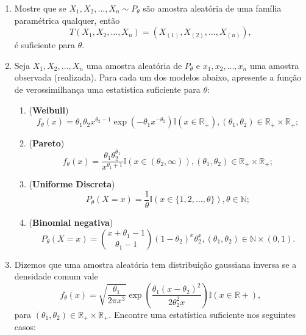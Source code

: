\documentclass[a4paper,10pt, notitlepage]{report}
\newcommand{\rs}{X_1, X_2, \ldots, X_n} %
\newcommand{\rsd}{x_1, x_2, \ldots, x_n} %
\newcommand{\rpl}{\mathbb{R}_+}
\begin{document}
\begin{enumerate}
    \item Mostre que se $\rs \sim P_\theta$ são amostra aleatória de uma família paramétrica qualquer, então
    $$T(\rs) = (X_{(1)}, X_{(2)}, \ldots, X_{(n)}),$$
    é suficiente para $\theta$.
    \item Seja $\rs$ uma amostra aleatória de $P_\theta$ e $\rsd$ uma amostra observada (realizada).
    Para cada um dos modelos abaixo, apresente a função de verossimilhança uma estatística suficiente para $\theta$:
    \begin{enumerate}
        \item (\textbf{Weibull})
        \begin{equation*}
            f_\theta(x) = \theta_1\theta_2 x^{\theta_2-1}\exp\left(-\theta_1 x^{-\theta_2}\right)\mathbb{I}(x \in \rpl), (\theta_1, \theta_2) \in \rpl \times \rpl;
        \end{equation*}
        \item (\textbf{Pareto}) 
        \begin{equation*}
            f_\theta(x) = \frac{\theta_1\theta_2^{\theta_1}}{x^{\theta_1 + 1}}\mathbb{I}\left(x \in (\theta_2, \infty)\right), (\theta_1, \theta_2) \in \rpl \times \rpl;
        \end{equation*}
        \item (\textbf{Uniforme Discreta})
        \begin{equation*}
            P_\theta(X = x) = \frac{1}{\theta}\mathbb{I}(x \in \{1, 2, \ldots,\theta\}), \theta \in \mathbb{N};
        \end{equation*}
        \item (\textbf{Binomial negativa})
        \begin{equation*}
            P_\theta(X = x) = \binom{x + \theta_1 - 1}{\theta_1-1}(1-\theta_2)^x \theta_2^x, (\theta_1, \theta_2) \in \mathbb{N} \times (0, 1).
        \end{equation*}
    \end{enumerate}
    \item Dizemos que uma amostra aleatória tem distribuição gaussiana inversa se a densidade comum vale
    \begin{equation*}
        f_\theta(x) = \sqrt{\frac{\theta_1}{2\pi x^3}} \exp\left(\frac{\theta_1(x-\theta_2)^2}{2\theta_2^2x}\right)\mathbb{I}(x \in \mathbb{R}+),
    \end{equation*}
    para $(\theta_1, \theta_2) \in \rpl \times \mathbb{R}_{+}$.
    Encontre uma estatística suficiente nos seguintes casos:

\end{enumerate}
\end{document}
